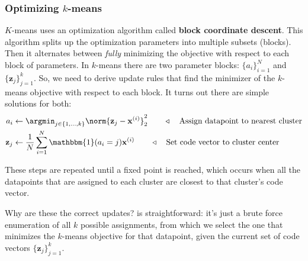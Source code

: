\subsubsection{Optimizing $k$-means} $K$-means uses an optimization algorithm called \textbf{block coordinate descent}. This algorithm splits up the optimization parameters into multiple subsets (blocks). Then it alternates between \textit{fully} minimizing the objective with respect to each block of parameters. In $k$-means there are two parameter blocks: $\{a_i\}_{i=1}^N$ and $\{\mathbf{z}_j\}_{j=1}^k$. So, we need to derive update rules that find the minimizer of the $k$-means objective with respect to each block. It turns out there are simple solutions for both:
\begin{align}
    a_i          & \leftarrow \argmin_{j \in \{1,\ldots,k\}} \norm{\mathbf{z}_j - \mathbf{x}^{(i)}}_2^2 \quad\quad \triangleleft\quad\text{Assign datapoint to nearest cluster}\label{eqn:representation_learning:kmeans_update_assignments} \\
    \mathbf{z}_j & \leftarrow \frac{1}{N}\sum_{i=1}^N \mathbbm{1}(a_i = j)\mathbf{x}^{(i)} \quad\quad \triangleleft\quad\text{Set code vector to cluster center}\label{eqn:representation_learning:kmeans_update_means}
\end{align}

These steps are repeated until a fixed point is reached, which occurs when all the datapoints that are assigned to each cluster are closest to that cluster's code vector.

Why are these the correct updates? \Eqn{\ref{eqn:representation_learning:kmeans_update_assignments}} is straightforward: it's just a brute force enumeration of all $k$ possible assignments, from which we select the one that minimizes the $k$-means objective for that datapoint, given the current set of code vectors $\{\mathbf{z}_j\}_{j=1}^k$.

